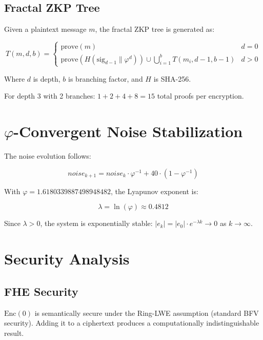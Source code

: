 \documentclass{article}
\begin{document}
\subsection{Fractal ZKP Tree}

Given a plaintext message $m$, the fractal ZKP tree is generated as:

\begin{equation}
T(m, d, b) = \begin{cases}
\text{prove}(m) & d = 0 \\
\text{prove}(H(\text{sig}_{d-1} \parallel \varphi^d)) \cup \bigcup_{i=1}^{b} T(m_i, d-1, b-1) & d > 0
\end{cases}
\end{equation}

Where $d$ is depth, $b$ is branching factor, and $H$ is SHA-256.

For depth 3 with 2 branches: $1 + 2 + 4 + 8 = 15$ total proofs per encryption.

\section{$\varphi$-Convergent Noise Stabilization}

The noise evolution follows:

\begin{equation}
noise_{k+1} = noise_k \cdot \varphi^{-1} + 40 \cdot (1 - \varphi^{-1})
\end{equation}

With $\varphi = 1.6180339887498948482$, the Lyapunov exponent is:

\begin{equation}
\lambda = \ln(\varphi) \approx 0.4812
\end{equation}

Since $\lambda > 0$, the system is exponentially stable: $|e_k| = |e_0| \cdot e^{-\lambda k} \to 0$ as $k \to \infty$.

\section{Security Analysis}

\subsection{FHE Security}

$\text{Enc}(0)$ is semantically secure under the Ring-LWE assumption (standard BFV security). Adding it to a ciphertext produces a computationally indistinguishable result.
\end{document}
